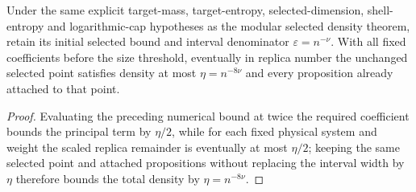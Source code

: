 \begin{lemma}
    \label{thm:arealaw-selected-density-eight-nu}
    \leanok
    Under the same explicit target-mass, target-entropy, selected-dimension,
    shell-entropy and logarithmic-cap hypotheses as the modular selected
    density theorem, retain its initial selected bound and interval denominator
    $\varepsilon=n^{-\nu}$.  With all fixed coefficients before the size
    threshold, eventually in replica number the unchanged selected point
    satisfies density at most $\eta=n^{-8\nu}$ and every proposition
    already attached to that point.
\end{lemma}
\begin{proof}
    \leanok
    Evaluating the preceding numerical bound at twice the required coefficient
    bounds the principal term by $\eta/2$, while for each fixed physical
    system and weight the scaled replica remainder is eventually at most
    $\eta/2$; keeping the same selected point and attached propositions
    without replacing the interval width by $\eta$ therefore bounds the total
    density by $\eta=n^{-8\nu}$.
\end{proof}

